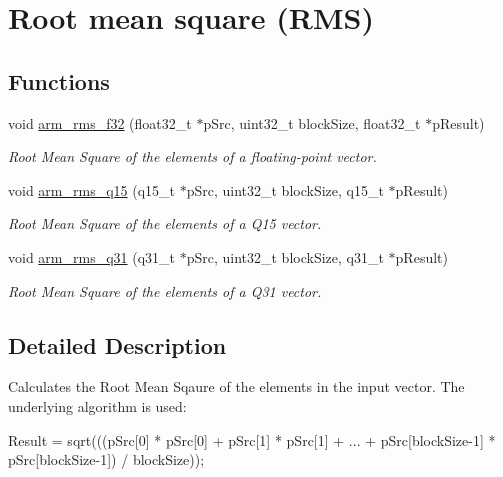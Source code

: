 \hypertarget{group__RMS}{}\section{Root mean square (R\+MS)}
\label{group__RMS}
\subsection*{Functions}
\begin{DoxyCompactItemize}
\item 
void \hyperlink{group__RMS_ga0e3ab1b57da32d45388d1fa90d7fd88c}{arm\+\_\+rms\+\_\+f32} (float32\+\_\+t $\ast$p\+Src, uint32\+\_\+t block\+Size, float32\+\_\+t $\ast$p\+Result)
\begin{DoxyCompactList}\small\item\em Root Mean Square of the elements of a floating-\/point vector. \end{DoxyCompactList}\item 
void \hyperlink{group__RMS_gaf5b836b72dda9e5dfbbd17c7906fd13f}{arm\+\_\+rms\+\_\+q15} (q15\+\_\+t $\ast$p\+Src, uint32\+\_\+t block\+Size, q15\+\_\+t $\ast$p\+Result)
\begin{DoxyCompactList}\small\item\em Root Mean Square of the elements of a Q15 vector. \end{DoxyCompactList}\item 
void \hyperlink{group__RMS_gae33015fda23fc44e7ead5e5ed7e8d314}{arm\+\_\+rms\+\_\+q31} (q31\+\_\+t $\ast$p\+Src, uint32\+\_\+t block\+Size, q31\+\_\+t $\ast$p\+Result)
\begin{DoxyCompactList}\small\item\em Root Mean Square of the elements of a Q31 vector. \end{DoxyCompactList}\end{DoxyCompactItemize}


\subsection{Detailed Description}
Calculates the Root Mean Sqaure of the elements in the input vector. The underlying algorithm is used\+:


\begin{DoxyPre}
    Result = sqrt(((pSrc[0] * pSrc[0] + pSrc[1] * pSrc[1] + ... + pSrc[blockSize-1] * pSrc[blockSize-1]) / blockSize));
\end{DoxyPre}



